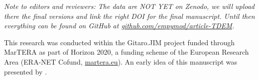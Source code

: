 \documentclass[extra, camera,%
    onecolumn,   %
    referee,     %
]{gji}
\begin{document}
\emph{Note to editors and reviewers: The data are NOT YET on Zenodo, we will
upload there the final versions and link the right DOI for the final
manuscript. Until then everything can be found on GitHub at
\href{https://github.com/empymod/article-TDEM}%
{github.com/empymod/article-TDEM}.}


\begin{acknowledgments} %
This research was conducted within the Gitaro.JIM project funded through
MarTERA as part of Horizon 2020, a funding scheme of the European Research Area
(ERA-NET Cofund, \href{https://www.martera.eu}{martera.eu}). An early idea of
this manuscript was presented by \cite{EAGE.20.Werthmuller}.
\end{acknowledgments}





\label{lastpage}
\end{document}
